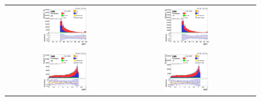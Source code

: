 \begin{figure}[ht]
  \begin{center}
    \begin{tabular}{ccc}
      \includegraphics[width=0.4\textwidth]{figures/tW/fig/Step2/ee/H_MET_Et.png}&
      \includegraphics[width=0.4\textwidth]{figures/tW/fig/Step2/mumu/H_MET_Et.png}\\
      \includegraphics[width=0.4\textwidth]{figures/tW/fig/Step2/ee/H_ll_Dphi.png}&
      \includegraphics[width=0.4\textwidth]{figures/tW/fig/Step2/mumu/H_ll_Dphi.png}\\

\end{tabular}
\end{center}
\end{figure}
